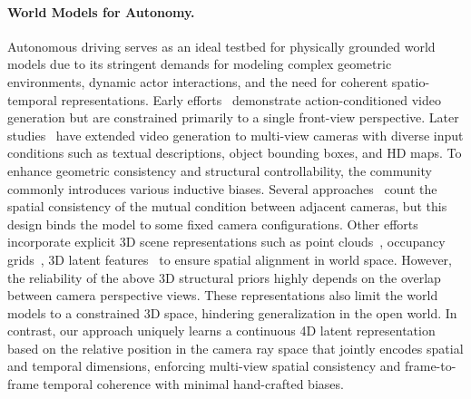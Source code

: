 \paragraph{World Models for Autonomy.}
Autonomous driving serves as an ideal testbed for physically grounded world models due to its stringent demands for modeling complex geometric environments, dynamic actor interactions, and the need for coherent spatio-temporal representations. Early efforts~\cite{wang2023drivedreamerrealworlddrivenworldmodels,hu2023gaia1generativeworldmodel} demonstrate action-conditioned video generation but are constrained primarily to a single front-view perspective. Later studies~\cite{wang2023drivingfuturemultiviewvisual,wang2023drivedreamer,wen2024panacea} have extended video generation to multi-view cameras with diverse input conditions such as textual descriptions, object bounding boxes, and HD maps. To enhance geometric consistency and structural controllability, the community commonly introduces various inductive biases. Several approaches~\cite{wang2023drivingfuturemultiviewvisual,gao2023magicdrive,wen2024panacea} count the spatial consistency of the mutual condition between adjacent cameras, but this design binds the model to some fixed camera configurations. Other efforts incorporate explicit 3D scene representations such as point clouds~\cite{xie2024x,zhou2025hermes,zhang2024bevworld}, occupancy grids~\cite{lu2023wovogen}, 3D latent features~\cite{zuo2025gaussianworld,gao2024magicdrive3d} to ensure spatial alignment in world space. However, the reliability of the above 3D structural priors highly depends on the overlap between camera perspective views. These representations also limit the world models to a constrained 3D space, hindering generalization in the open world. In contrast, our approach uniquely learns a continuous 4D latent representation based on the relative position in the camera ray space that jointly encodes spatial and temporal dimensions, enforcing multi-view spatial consistency and frame-to-frame temporal coherence with minimal hand-crafted biases.
